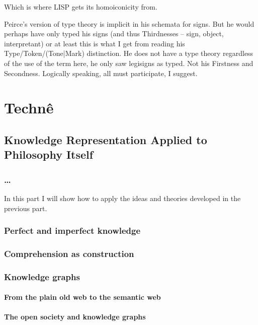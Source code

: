 \documentclass[dah,phd,a4paper]{xe_uccthesis}
\begin{document}
Which is where LISP gets its homoiconicity from.

Peirce's version of type theory is implicit in his schemata for signs. But he would perhaps have only typed his signs (and thus Thirdnesses – sign, object, interpretant) or at least this is what I get from reading his Type/Token/(Tone|Mark) distinction. He does not have a type theory regardless of the use of the term here, he only saw legisigns as typed.
Not his Firstness and Secondness. Logically speaking, all must participate, I suggest.

\part{Technê}

\chapter{Knowledge Representation Applied to Philosophy Itself}

\section{…}

In this part I will show how to apply the ideas and theories developed in the previous part.

\section{Perfect and imperfect knowledge}

\lipsum[92]

\section{Comprehension as construction}

\lipsum[93]

\section{Knowledge graphs}


\subsection{From the plain old web to the semantic web}

\lipsum[94]

\subsection{The open society and knowledge graphs}
\end{document}
